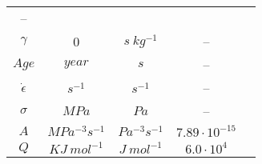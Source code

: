 \documentclass[a4paper,11pt]{article}
\begin{document}
\begin{longtable}{|c|c|c|c|c|}
-- & \\
\cline{1-4}
\begin{math} \gamma \end{math} &
0 &
\begin{math} s \: {kg^{-1}} \end{math} &
-- & \\
\cline{1-4}
\begin{math} Age \end{math} &
\begin{math} year \end{math} &
\begin{math} s \end{math} &
-- & \\
\cline{1-4}
\begin{math} \dot{\epsilon}\end{math} &
\begin{math} s^{-1} \end{math} &
\begin{math} s^{-1} \end{math} &
-- & \\
\cline{1-4}
\begin{math} \sigma \end{math} &
\begin{math} MPa\end{math} &
\begin{math} Pa \end{math} &
-- & \\
\cline{1-4}
\begin{math} A \end{math} &
\begin{math}MPa^{-3}s^{-1} \end{math} &
\begin{math} Pa^{-3}s^{-1} \end{math} &
\begin{math} 7.89 \cdot 10^{-15} \end{math}& \\
\cline{1-4}
\begin{math} Q \end{math} &
\begin{math} KJ  \: {mol}^{-1} \end{math} &
\begin{math} J  \: {mol}^{-1} \end{math} &
\begin{math} 6.0 \cdot 10^4 \end{math} & \\
\cline{1-4}

\end{longtable}
\end{document}
